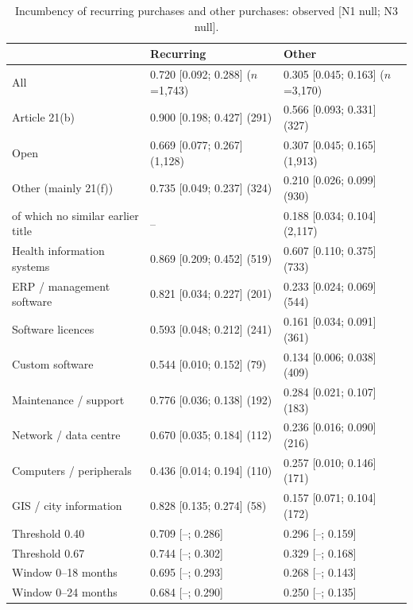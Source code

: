 \documentclass[11pt,a4paper]{article}
\newcommand{\botrule}{\bottomrule}
\begin{document}
\begin{table}[h]\centering\small
\caption{Incumbency of recurring purchases and other purchases: observed [N1 null; N3 null].}\label{tab:renew}
\begin{tabular}{@{}lll@{}}
\toprule
 & Recurring & Other\\
\midrule
All & 0.720 [0.092; 0.288] ($n$=1,743) & 0.305 [0.045; 0.163] ($n$=3,170)\\
Article 21(b) & 0.900 [0.198; 0.427] (291) & 0.566 [0.093; 0.331] (327)\\
Open & 0.669 [0.077; 0.267] (1,128) & 0.307 [0.045; 0.165] (1,913)\\
Other (mainly 21(f)) & 0.735 [0.049; 0.237] (324) & 0.210 [0.026; 0.099] (930)\\
\quad of which no similar earlier title & -- & 0.188 [0.034; 0.104] (2,117)\\
\midrule
Health information systems & 0.869 [0.209; 0.452] (519) & 0.607 [0.110; 0.375] (733)\\
ERP / management software & 0.821 [0.034; 0.227] (201) & 0.233 [0.024; 0.069] (544)\\
Software licences & 0.593 [0.048; 0.212] (241) & 0.161 [0.034; 0.091] (361)\\
Custom software & 0.544 [0.010; 0.152] (79) & 0.134 [0.006; 0.038] (409)\\
Maintenance / support & 0.776 [0.036; 0.138] (192) & 0.284 [0.021; 0.107] (183)\\
Network / data centre & 0.670 [0.035; 0.184] (112) & 0.236 [0.016; 0.090] (216)\\
Computers / peripherals & 0.436 [0.014; 0.194] (110) & 0.257 [0.010; 0.146] (171)\\
GIS / city information & 0.828 [0.135; 0.274] (58) & 0.157 [0.071; 0.104] (172)\\
\midrule
Threshold 0.40 & 0.709 [--; 0.286] & 0.296 [--; 0.159]\\
Threshold 0.67 & 0.744 [--; 0.302] & 0.329 [--; 0.168]\\
Window 0--18 months & 0.695 [--; 0.293] & 0.268 [--; 0.143]\\
Window 0--24 months & 0.684 [--; 0.290] & 0.250 [--; 0.135]\\
\botrule
\end{tabular}
\end{table}
\end{document}
